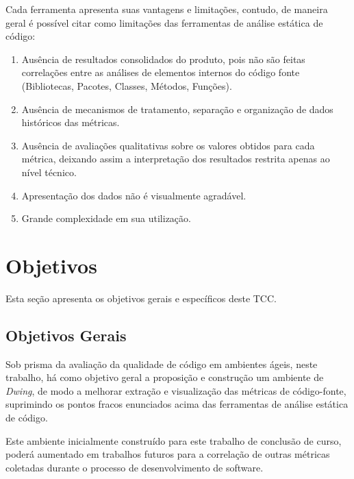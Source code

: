 Cada ferramenta apresenta suas vantagens e limitações, contudo, de maneira geral é possível citar como limitações das ferramentas de análise estática de código:

\begin{enumerate}
\item Ausência de resultados consolidados do produto, pois não são feitas correlações entre as análises de elementos internos do código fonte (Bibliotecas, Pacotes, Classes, Métodos, Funções).
\item Ausência de mecanismos de tratamento, separação e organização de dados históricos das métricas.
\item Ausência de avaliações qualitativas sobre os valores obtidos para cada métrica, deixando assim a interpretação dos resultados restrita apenas ao nível técnico.
\item Apresentação dos dados não é visualmente agradável.
\item Grande complexidade em sua utilização.
\end{enumerate}








\section{Objetivos}

Esta seção apresenta os objetivos gerais e específicos deste TCC.

\subsection{Objetivos Gerais}
Sob prisma da avaliação da qualidade de código em ambientes ágeis, neste trabalho, há como objetivo geral a proposição e construção um ambiente de \textit{Dwing}, de modo a melhorar extração e visualização das métricas de código-fonte, suprimindo os pontos fracos enunciados acima das ferramentas de análise estática de código.

Este ambiente inicialmente construído para este trabalho de conclusão de curso, poderá aumentado em trabalhos futuros para a correlação de outras métricas coletadas
durante o processo de desenvolvimento de software. 


